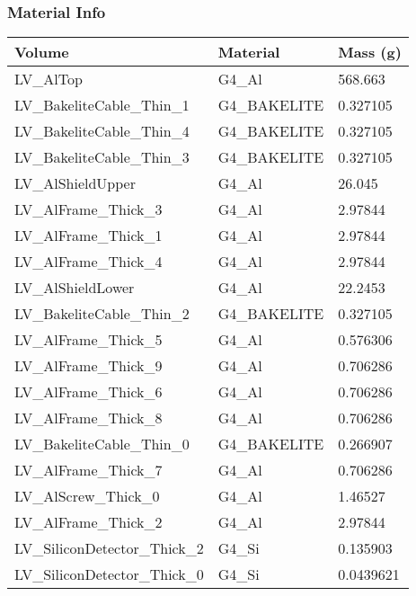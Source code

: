 \documentclass[8pt]{beamer}
\begin{document}
            \begin{frame}
                \frametitle{Material Info}
            
            \begin{table}
            \begin{tabular}{lll}
             Volume & Material & Mass (g) \\
                    
            \midrule
            LV\_AlTop & G4\_Al & 568.663\\
                        LV\_BakeliteCable\_Thin\_1 & G4\_BAKELITE & 0.327105\\
                        LV\_BakeliteCable\_Thin\_4 & G4\_BAKELITE & 0.327105\\
                        LV\_BakeliteCable\_Thin\_3 & G4\_BAKELITE & 0.327105\\
                        LV\_AlShieldUpper & G4\_Al & 26.045\\
                        LV\_AlFrame\_Thick\_3 & G4\_Al & 2.97844\\
                        LV\_AlFrame\_Thick\_1 & G4\_Al & 2.97844\\
                        LV\_AlFrame\_Thick\_4 & G4\_Al & 2.97844\\
                        LV\_AlShieldLower & G4\_Al & 22.2453\\
                        LV\_BakeliteCable\_Thin\_2 & G4\_BAKELITE & 0.327105\\
                        LV\_AlFrame\_Thick\_5 & G4\_Al & 0.576306\\
                        LV\_AlFrame\_Thick\_9 & G4\_Al & 0.706286\\
                        LV\_AlFrame\_Thick\_6 & G4\_Al & 0.706286\\
                        LV\_AlFrame\_Thick\_8 & G4\_Al & 0.706286\\
                        LV\_BakeliteCable\_Thin\_0 & G4\_BAKELITE & 0.266907\\
                        LV\_AlFrame\_Thick\_7 & G4\_Al & 0.706286\\
                        LV\_AlScrew\_Thick\_0 & G4\_Al & 1.46527\\
                        LV\_AlFrame\_Thick\_2 & G4\_Al & 2.97844\\
                        LV\_SiliconDetector\_Thick\_2 & G4\_Si & 0.135903\\
                        LV\_SiliconDetector\_Thick\_0 & G4\_Si & 0.0439621\\

\end{tabular}
\end{table}
\end{frame}
\end{document}
